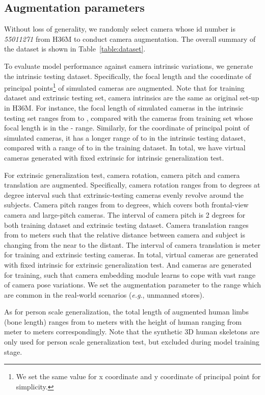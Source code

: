 \documentclass[10pt,twocolumn,letterpaper]{article}
\def\eg{\emph{e.g}}
\begin{document}
\subsection*{Augmentation parameters}
Without loss of generality, we randomly select  camera whose id number is \emph{55011271} from H36M to conduct camera augmentation. The overall summary of the dataset is shown in Table~\ref{table:dataset}. 

To evaluate model performance against camera intrinsic variations, we generate the intrinsic testing dataset. Specifically, the focal length and the coordinate of principal points\footnote{We set the same value for x coordinate and y coordinate of principal point for simplicity.} of simulated cameras are augmented. Note that for training dataset and extrinsic testing set, camera intrinsics are the same as original set-up in H36M. For instance, the focal length of simulated cameras in the intrinsic testing set ranges from  to , compared with the cameras from training set whose focal length is in the - range. Similarly, for the  coordinate of principal point of simulated cameras, it has a longer range of  to  in the intrinsic testing dataset, compared with a range of  to  in the training dataset. In total, we have  virtual cameras generated with fixed extrinsic for intrinsic generalization test. 

For extrinsic generalization test, camera rotation, camera pitch and camera translation are augmented. Specifically, camera rotation ranges from  to  degrees at  degree interval such that extrinsic-testing cameras evenly revolve around the subjects. Camera pitch ranges from  to  degrees, which covers both frontal-view camera and large-pitch cameras. The interval of camera pitch is 2 degrees for both training dataset and extrinsic testing dataset. Camera translation ranges from  to  meters such that the relative distance between camera and subject is changing from the near to the distant. The interval of camera translation is  meter for training and extrinsic testing cameras. In total,  virtual cameras are generated with fixed intrinsic for extrinsic generalization test. And  cameras are generated for training, such that camera embedding module learns to cope with vast range of camera pose variations. We set the augmentation parameter to the range which are common in the real-world scenarios (\eg., unmanned stores).

As for person scale generalization, the total length of augmented human limbs (bone length) ranges from  to  meters with the height of human ranging from  meter to  meters correspondingly. Note that the synthetic 3D human skeletons are only used for person scale generalization test, but excluded during model training stage.
\end{document}
